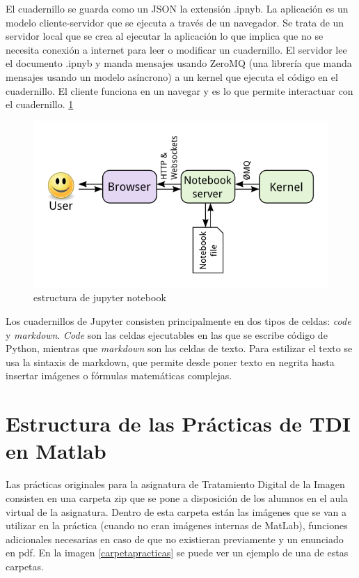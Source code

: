\documentclass[a4paper,12pt]{report}
\begin{document}
El cuadernillo se guarda como un JSON la extensión .ipnyb. La aplicación es un modelo cliente-servidor que se ejecuta a través de un navegador. Se trata de un servidor local que se crea al ejecutar la aplicación lo que implica que no se necesita conexión a internet para leer o modificar un cuadernillo.  El servidor lee el documento .ipnyb y manda mensajes usando ZeroMQ (una librería que manda mensajes usando un modelo asíncrono) a un kernel que ejecuta el código en el cuadernillo. El cliente funciona en un navegar y es lo que permite interactuar con el cuadernillo.  	\ref{estructurajupyter}
\begin{figure}[h]
\centering
\includegraphics[width=1.0\textwidth]{imagenes/estructurajupyter}
\caption{estructura de jupyter notebook}
\label{estructurajupyter}
\end{figure}

Los cuadernillos de Jupyter consisten principalmente en dos tipos de celdas: \emph{code} y \emph{markdown}.\emph{ Code }son las celdas ejecutables en las que se escribe código de Python, mientras que \emph{markdown} son las celdas de texto. Para estilizar el texto se usa  la sintaxis de markdown, que permite desde poner texto en negrita hasta insertar imágenes o fórmulas matemáticas complejas.\\




\section{Estructura de las Prácticas de TDI en Matlab}


Las prácticas originales para la asignatura de Tratamiento Digital de la Imagen consisten en una carpeta zip que se pone a disposición de los alumnos en el aula virtual de la asignatura. Dentro de esta carpeta están las imágenes que se van a utilizar en la práctica (cuando no eran imágenes internas de MatLab), funciones adicionales necesarias en caso de que no existieran previamente y un enunciado en pdf. En la imagen \ref{carpetapracticas} se puede ver un ejemplo de una de estas carpetas.
 
\end{document}
